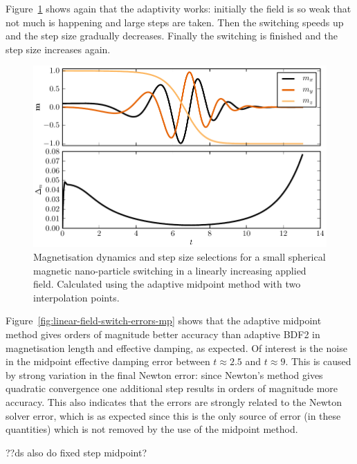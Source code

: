 Figure~\ref{fig:linear-field-switch-mp} shows again that the adaptivity works: initially the field is so weak that not much is happening and large steps are taken.
Then the switching speeds up and the step size gradually decreases.
Finally the switching is finished and the step size increases again.

\begin{figure}[ht!]
  \centering
  \includegraphics{images/linear_field_switch_solution}
  \caption{Magnetisation dynamics and step size selections for a small spherical magnetic nano-particle switching in a linearly increasing applied field. Calculated using the adaptive midpoint method with two interpolation points.}
  \label{fig:linear-field-switch-mp}
\end{figure}

Figure~\ref{fig:linear-field-switch-errors-mp} shows that the adaptive midpoint method gives orders of magnitude better accuracy than adaptive BDF2 in magnetisation length and effective damping, as expected.
Of interest is the noise in the midpoint effective damping error between $t \approx 2.5$ and $t \approx 9$.
This is caused by strong variation in the final Newton error: since Newton's method gives quadratic convergence one additional step results in orders of magnitude more accuracy.
This also indicates that the errors are strongly related to the Newton solver error, which is as expected since this is the only source of error (in these quantities) which is not removed by the use of the midpoint method.

??ds also do fixed step midpoint?

